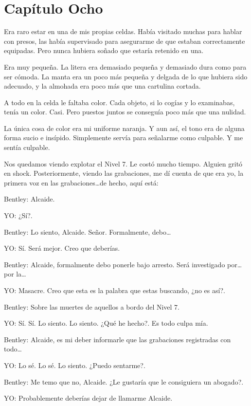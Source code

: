 \chapter*{Capítulo Ocho}

Era raro estar en una de mis propias celdas. Había visitado muchas para
hablar con presos, las había supervisado para asegurarme de que estaban
correctamente equipadas. Pero nunca hubiera soñado que estaría retenido
en una.

Era muy pequeña. La litera era demasiado pequeña y demasiado dura como
para ser cómoda. La manta era un poco más pequeña y delgada de lo que
hubiera sido adecuado, y la almohada era poco más que una cartulina
cortada.

A todo en la celda le faltaba color. Cada objeto, si lo cogías y lo
examinabas, tenía un color. Casi. Pero puestos juntos se conseguía poco
más que una nulidad.

La única cosa de color era mi uniforme naranja. Y aun así, el tono era
de alguna forma sucio e insípido. Simplemente servía para señalarme como
culpable. Y me sentía culpable.

Nos quedamos viendo explotar el Nivel 7. Le costó mucho tiempo. Alguien
gritó en shock. Posteriormente, viendo las grabaciones, me dí cuenta de
que era yo, la primera voz en las grabaciones\ldots{}de hecho, aquí
está:

Bentley: Alcaide.

YO: ¿Sí?.

Bentley: Lo siento, Alcaide. Señor. Formalmente, debo\ldots{}

YO: Sí. Será mejor. Creo que deberías.

Bentley: Alcaide, formalmente debo ponerle bajo arresto. Será
investigado por\ldots{} por la\ldots{}

YO: Masacre. Creo que esta es la palabra que estas buscando, ¿no es
así?.

Bentley: Sobre las muertes de aquellos a bordo del Nivel 7.

YO: Sí. Sí. Lo siento. Lo siento. ¿Qué he hecho?. Es todo culpa mía.

Bentley: Alcaide, es mi deber informarle que las grabaciones registradas
con todo\ldots{}

YO: Lo sé. Lo sé. Lo siento. ¿Puedo sentarme?.

Bentley: Me temo que no, Alcaide. ¿Le gustaría que le consiguiera un
abogado?.

YO: Probablemente deberías dejar de llamarme Alcaide.

